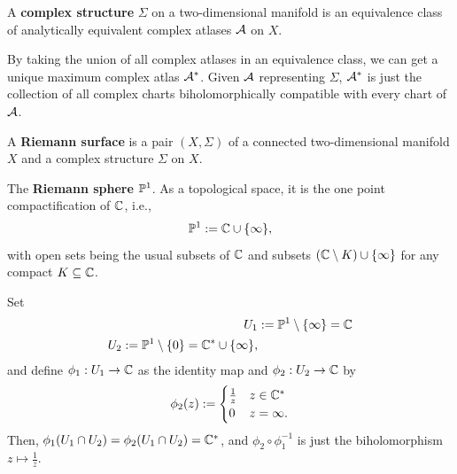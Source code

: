 \documentclass[12pt]{article}
\begin{document}
\begin{defn}
    A \textbf{complex structure} $\Sigma$ on a two-dimensional manifold is an equivalence class of analytically equivalent complex atlases $\cA$ on $X$.
\end{defn}

\begin{rmk}
    By taking the union of all complex atlases in an equivalence class, we can get a unique maximum complex atlas $\cA^*$. Given $\cA$ representing $\Sigma$, $\cA^*$ is just the collection of all complex charts biholomorphically compatible with every chart of $\cA$.
\end{rmk}

\begin{defn}
    A \textbf{Riemann surface} is a pair $(X, \Sigma)$ of a connected two-dimensional manifold $X$ and a complex structure $\Sigma$ on $X$.
\end{defn}

\begin{eg}
    The \textbf{Riemann sphere} $\P^1$. As a topological space, it is the one point compactification of $\C$, i.e.,
    \[\P^1 \defeq \C \cup \{\infty\},\]
    with open sets being the usual subsets of $\C$ and subsets $(\C\setminus K) \cup \{\infty\}$ for any compact $K\subseteq \C$.
    
    Set
    \begin{align*}
        U_1 &\defeq \P^1 \setminus \{\infty\} = \C\\
        U_2 \defeq \P^1 \setminus \{0\} = \C^* \cup \{\infty\},
    \end{align*}
    and define $\phi_1: U_1\to \C$ as the identity map and $\phi_2: U_2\to \C$ by
    \[
        \phi_2(z) \defeq \begin{cases}
            \frac{1}{z} & z\in \C^*\\
            0 & z=\infty.
        \end{cases}
    \]
    Then, $\phi_1(U_1\cap U_2)=\phi_2(U_1\cap U_2)=\C^*$, and $\phi_2\circ \phi_1^{-1}$ is just the biholomorphism $z\mapsto \frac{1}{z}$.
\end{eg}
\end{document}
